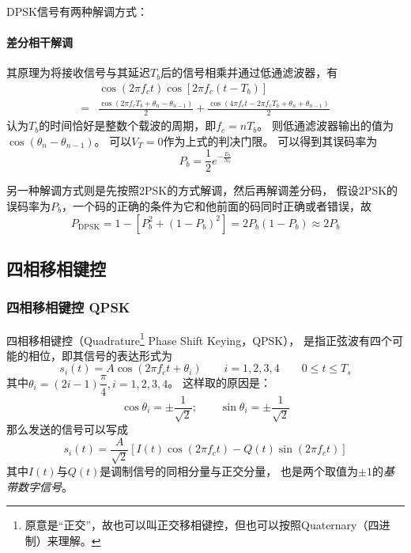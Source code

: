    DPSK信号有两种解调方式：
    \paragraph{差分相干解调}
    其原理为将接收信号与其延迟$T_b$后的信号相乘并通过低通滤波器，有
    \begin{equation}
        \begin{split}
            &\cos(2\pi f_ct)\cos[2\pi f_c(t-T_b)]\\
            =&\frac{\cos(2\pi f_cT_b+\theta_n-\theta_{n-1})}{2}+\frac{\cos(4\pi f_ct-2\pi f_c T_b+\theta_n+\theta_{n-1})}{2}
        \end{split}
    \end{equation}
    认为$T_b$的时间恰好是整数个载波的周期，即$f_c=nT_b$。
    则低通滤波器输出的值为$\cos(\theta_n-\theta_{n-1})$。
    可以$V_T=0$作为上式的判决门限。
    可以得到其误码率为
    \begin{equation}
        P_b=\frac{1}{2}e^{-\frac{E_b}{N_0}}
    \end{equation}

    另一种解调方式则是先按照2PSK的方式解调，然后再解调差分码，
    假设2PSK的误码率为$P_b$，一个码的正确的条件为它和他前面的码同时正确或者错误，故
    \begin{equation}
        P_{\text{DPSK}}=1-[P_b^2+(1-P_b)^2]=2P_b(1-P_b)\approx 2P_b
    \end{equation}

\subsection{四相移相键控}
    \subsubsection{四相移相键控 QPSK}
    四相移相键控（Quadrature\footnote{原意是“正交”，故也可以叫正交移相键控，但也可以按照Quaternary（四进制）来理解。} Phase Shift Keying，QPSK），
    是指正弦波有四个可能的相位，即其信号的表达形式为
    \begin{equation}
        s_i(t)=A\cos(2\pi f_ct+\theta_i)\hspace{2em} i=1,2,3,4\hspace{2em}0\leq t \leq T_s
    \end{equation}
    其中$\theta_i=(2i-1)\dfrac{\pi}{4},i=1,2,3,4$。
    这样取的原因是：
    \begin{equation*}
        \cos\theta_i=\pm\frac{1}{\sqrt{2}};\hspace{2em}\sin\theta_i=\pm\frac{1}{\sqrt{2}}
    \end{equation*}
    那么发送的信号可以写成
    \begin{equation}
        s_i(t)=\frac{A}{\sqrt{2}}[I(t)\cos(2\pi f_ct)-Q(t)\sin(2\pi f_c t)]
    \end{equation}
    其中$I(t)$与$Q(t)$是调制信号的同相分量与正交分量，
    也是两个取值为$\pm 1$的\emph{基带数字信号}。

